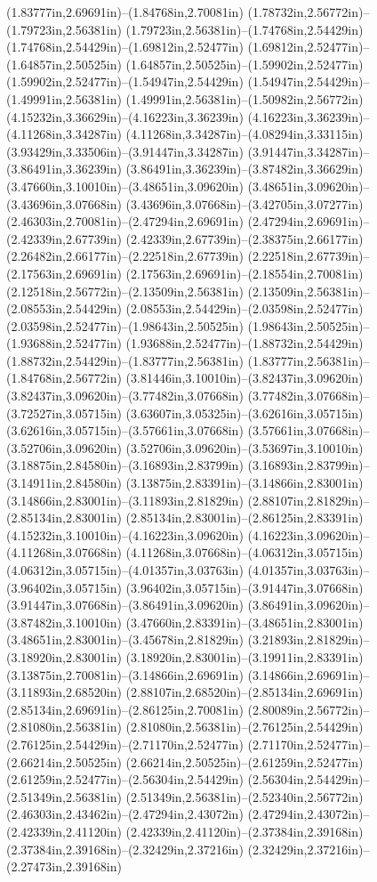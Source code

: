 (1.83777in,2.69691in)--(1.84768in,2.70081in) (1.78732in,2.56772in)--(1.79723in,2.56381in) (1.79723in,2.56381in)--(1.74768in,2.54429in) (1.74768in,2.54429in)--(1.69812in,2.52477in) (1.69812in,2.52477in)--(1.64857in,2.50525in) (1.64857in,2.50525in)--(1.59902in,2.52477in) (1.59902in,2.52477in)--(1.54947in,2.54429in) (1.54947in,2.54429in)--(1.49991in,2.56381in) (1.49991in,2.56381in)--(1.50982in,2.56772in) (4.15232in,3.36629in)--(4.16223in,3.36239in) (4.16223in,3.36239in)--(4.11268in,3.34287in) (4.11268in,3.34287in)--(4.08294in,3.33115in) (3.93429in,3.33506in)--(3.91447in,3.34287in) (3.91447in,3.34287in)--(3.86491in,3.36239in) (3.86491in,3.36239in)--(3.87482in,3.36629in) (3.47660in,3.10010in)--(3.48651in,3.09620in) (3.48651in,3.09620in)--(3.43696in,3.07668in) (3.43696in,3.07668in)--(3.42705in,3.07277in) (2.46303in,2.70081in)--(2.47294in,2.69691in) (2.47294in,2.69691in)--(2.42339in,2.67739in) (2.42339in,2.67739in)--(2.38375in,2.66177in) (2.26482in,2.66177in)--(2.22518in,2.67739in) (2.22518in,2.67739in)--(2.17563in,2.69691in) (2.17563in,2.69691in)--(2.18554in,2.70081in) (2.12518in,2.56772in)--(2.13509in,2.56381in) (2.13509in,2.56381in)--(2.08553in,2.54429in) (2.08553in,2.54429in)--(2.03598in,2.52477in) (2.03598in,2.52477in)--(1.98643in,2.50525in) (1.98643in,2.50525in)--(1.93688in,2.52477in) (1.93688in,2.52477in)--(1.88732in,2.54429in) (1.88732in,2.54429in)--(1.83777in,2.56381in) (1.83777in,2.56381in)--(1.84768in,2.56772in) (3.81446in,3.10010in)--(3.82437in,3.09620in) (3.82437in,3.09620in)--(3.77482in,3.07668in) (3.77482in,3.07668in)--(3.72527in,3.05715in) (3.63607in,3.05325in)--(3.62616in,3.05715in) (3.62616in,3.05715in)--(3.57661in,3.07668in) (3.57661in,3.07668in)--(3.52706in,3.09620in) (3.52706in,3.09620in)--(3.53697in,3.10010in) (3.18875in,2.84580in)--(3.16893in,2.83799in) (3.16893in,2.83799in)--(3.14911in,2.84580in) (3.13875in,2.83391in)--(3.14866in,2.83001in) (3.14866in,2.83001in)--(3.11893in,2.81829in) (2.88107in,2.81829in)--(2.85134in,2.83001in) (2.85134in,2.83001in)--(2.86125in,2.83391in) (4.15232in,3.10010in)--(4.16223in,3.09620in) (4.16223in,3.09620in)--(4.11268in,3.07668in) (4.11268in,3.07668in)--(4.06312in,3.05715in) (4.06312in,3.05715in)--(4.01357in,3.03763in) (4.01357in,3.03763in)--(3.96402in,3.05715in) (3.96402in,3.05715in)--(3.91447in,3.07668in) (3.91447in,3.07668in)--(3.86491in,3.09620in) (3.86491in,3.09620in)--(3.87482in,3.10010in) (3.47660in,2.83391in)--(3.48651in,2.83001in) (3.48651in,2.83001in)--(3.45678in,2.81829in) (3.21893in,2.81829in)--(3.18920in,2.83001in) (3.18920in,2.83001in)--(3.19911in,2.83391in) (3.13875in,2.70081in)--(3.14866in,2.69691in) (3.14866in,2.69691in)--(3.11893in,2.68520in) (2.88107in,2.68520in)--(2.85134in,2.69691in) (2.85134in,2.69691in)--(2.86125in,2.70081in) (2.80089in,2.56772in)--(2.81080in,2.56381in) (2.81080in,2.56381in)--(2.76125in,2.54429in) (2.76125in,2.54429in)--(2.71170in,2.52477in) (2.71170in,2.52477in)--(2.66214in,2.50525in) (2.66214in,2.50525in)--(2.61259in,2.52477in) (2.61259in,2.52477in)--(2.56304in,2.54429in) (2.56304in,2.54429in)--(2.51349in,2.56381in) (2.51349in,2.56381in)--(2.52340in,2.56772in) (2.46303in,2.43462in)--(2.47294in,2.43072in) (2.47294in,2.43072in)--(2.42339in,2.41120in) (2.42339in,2.41120in)--(2.37384in,2.39168in) (2.37384in,2.39168in)--(2.32429in,2.37216in) (2.32429in,2.37216in)--(2.27473in,2.39168in) 